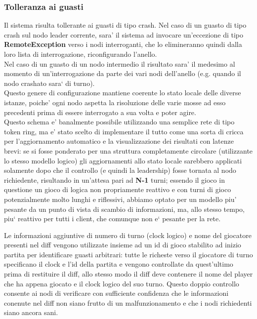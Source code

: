 \subsubsection{Tolleranza ai guasti}
	Il sistema risulta tollerante ai guasti di tipo crash.
	Nel caso di un guasto di tipo crash sul nodo leader corrente, sara' il
	sistema ad invocare un'eccezione di tipo \textbf{RemoteException} verso
	i nodi interroganti, che lo elimineranno quindi dalla loro lista di
	interrogazione, riconfigurando l'anello.\\
	Nel caso di un guasto di un nodo intermedio il risultato sara' il
	medesimo al momento di un'interrogazione da parte dei vari nodi
	dell'anello (e.g. quando il nodo crashato sara` di turno).\\
	Questo genere di configurazione mantiene coerente lo stato locale delle
	diverse istanze, poiche' ogni nodo aspetta la risoluzione delle varie
	mosse ad esso precedenti prima di essere interrogato a sua volta e poter
	agire.\\
	Questo schema e' banalmente possibile utilizzando una semplice rete di
	tipo token ring, ma e' stato scelto di implementare il tutto come una
	sorta di cricca per l'aggiornamento automatico e la visualizzazione dei
	risultati con latenze brevi: se si fosse ponderato per una struttura
	completamente circolare (utilizzante lo stesso modello logico) gli
	aggiornamenti allo stato locale sarebbero applicati solamente dopo che
	il controllo (e quindi la leadership) fosse tornata al nodo richiedente,
	risultando in un'attesa pari ad \textbf{N-1} turni; essendo il gioco
	in questione un gioco di logica non propriamente reattivo e con turni
	di gioco potenzialmente molto lunghi e riflessivi, abbiamo optato
	per un modello piu' pesante da un punto di vista
	di scambio di informazioni, ma, allo stesso tempo, piu` reattivo per tutti i client,
	che comunque non e` pesante per la rete.

	Le informazioni aggiuntive di numero di turno (clock logico) e nome del giocatore presenti nel diff vengono utilizzate insieme ad un id di gioco stabilito ad inizio partita per identificare guasti arbitrari: tutte le richeste verso il giocatore di turno specificano il clock e l'id della partita e vengono controllate da quest'ultimo prima di restituire il diff, allo stesso modo il diff deve contenere il nome del player che ha appena giocato e il clock logico del suo turno.
	Questo doppio controllo consente ai nodi di verificare con sufficiente confidenza che le informazioni conenute nel diff non siano frutto di un malfunzionamento e che i nodi richiedenti siano ancora sani.

